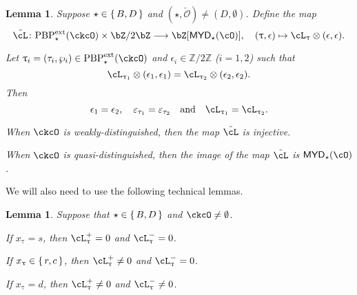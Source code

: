 \documentclass[12pt,a4paper]{amsart}
\def\MYD{{\mathsf{MYD}}}
\newcommand{\CO}{{\mathcal {O}}}
\newcommand{\Z}{\mathbb{Z}}
\numberwithin{equation}{section}
\newtheorem{lem}[thm]{Lemma}
\theoremstyle{remark}
\def\PBPe{\mathrm{PBP}^{\mathrm{ext}}}
\def\PBPes{\mathrm{PBP}^{\mathrm{ext}}_{\star}}
\begin{document}
\begin{lem}\label{lem:BD}
Suppose $\star \in \set{B,D}$ and $(\star, \check \CO)\neq (D, \emptyset)$. Define the map 
 \[
    \acme \colon
    \PBPes( \ckcO )\times \bZ/2\bZ \longrightarrow \bZ[\MYD_{\star}(\cO)],\quad
    (\uptau,\epsilon) \mapsto \ac_{\uptau}\otimes (\epsilon, \epsilon).
  \]
  \begin{enuma}
  \item Let $\uptau_i=(\tau_i, \wp_i)\in \PBPe_\star(\ckcO)$ and
  $\epsilon_i\in \Z/2\Z$ ($i=1,2$) such that
  \[
    \ac_{\uptau_1}\lotimes (\epsilon_{1},\epsilon_{1})= \ac_{\uptau_2}\lotimes( \epsilon_{2},\epsilon_{2} ).
  \]
  Then
  \[
    \epsilon_1=\epsilon_2,\quad \varepsilon_{\tau_1}=\varepsilon_{\tau_2} \AND \ac_{\uptau_{1}}=\ac_{\uptau_{2}}.
  \]

  \item When $\ckcO$ is weakly-distinguished, then the map $\acme$ is injective. 
  \item When $\ckcO$ is quasi-distinguished, then the image of the map $\acme$ is $\MYD_{\star}(\cO)$.
\end{enuma}
\end{lem}



\smallskip

We will also need to use the following technical lemmas.
\begin{lem}\label{lem:BD2}
Suppose that $\star \in \set{B,D}$ and $\ckcO \neq \emptyset$.
\begin{enuma}
  \item If $x_{\uptau}=s$, then $\ac_{\uptau}^{+} =0$ and $\ac_{\uptau}^{-}=0$.
  \item If $x_{\uptau}\in \set{r,c}$, then $\ac_{\uptau}^{+} \neq 0$ and $\ac_{\uptau}^{-}=0$.
  \item If $x_{\uptau}=d$, then $\ac_{\uptau}^{+} \neq 0$ and
  $\ac_{\uptau}^{-}\neq 0$.
\end{enuma}
\end{lem}
\end{document}
